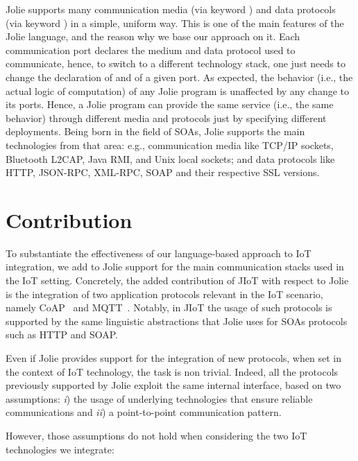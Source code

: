 Jolie supports many communication media (via keyword ) and data
protocols (via keyword ) in a simple, uniform way. This is one of
the main features of the Jolie language, and the reason why we base our approach
on it.
%
Each communication port declares the medium and data protocol used to
communicate, hence, to switch to a different technology stack, one just needs to
change the declaration of  and  of a given port.
As expected, the behavior (i.e., the actual logic of computation) of any Jolie
program is unaffected by any change to its ports. Hence, a Jolie program can
provide the same service (i.e., the same behavior) through different media and
protocols just by specifying different deployments. Being born in the field of
SOAs, Jolie supports the main technologies from that area: e.g., communication
media like TCP/IP sockets, Bluetooth L2CAP, Java RMI, and Unix local sockets;
and data protocols like HTTP, JSON-RPC, XML-RPC, SOAP and their respective SSL
versions.

\section{Contribution}
\label{sec:contribution}

To substantiate the effectiveness of our language-based approach to IoT
integration, we add to Jolie support for the main communication stacks used in
the IoT setting. Concretely, the added contribution of JIoT with respect to
Jolie is the integration of two application protocols relevant in the IoT
scenario, namely CoAP~\cite{doi:10.17487/RFC7252,coap} and
MQTT~\cite{mqtt-v3.1.1,mqtt}. Notably, in JIoT the usage of such protocols is
supported by the same linguistic abstractions that Jolie uses for SOAs protocols
such as HTTP and SOAP.

Even if Jolie provides support for the integration of new protocols, when set in
the context of IoT technology, the task is non trivial. Indeed, all the
protocols previously supported by Jolie exploit the same internal interface,
based on two assumptions: \emph{i}) the usage of underlying technologies that
ensure reliable communications and \emph{ii}) a point-to-point communication
pattern.

However, those assumptions do not hold when considering the two IoT technologies
we integrate:

